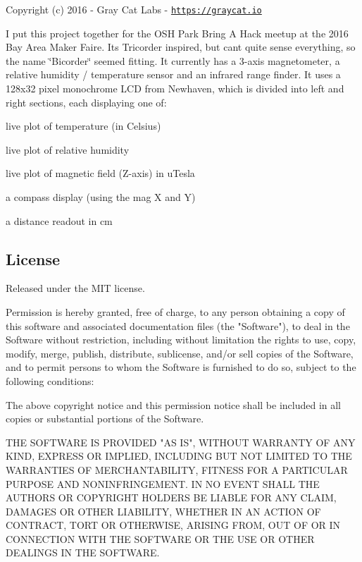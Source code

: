 Copyright (c) 2016 -\/ Gray Cat Labs -\/ \href{https://graycat.io}{\tt https\+://graycat.\+io}

I put this project together for the O\+SH Park Bring A Hack meetup at the 2016 Bay Area Maker Faire. It\textquotesingle{}s Tricorder inspired, but can\textquotesingle{}t quite sense everything, so the name \char`\"{}\+Bicorder\char`\"{} seemed fitting. It currently has a 3-\/axis magnetometer, a relative humidity / temperature sensor and an infrared range finder. It uses a 128x32 pixel monochrome L\+CD from Newhaven, which is divided into left and right sections, each displaying one of\+:


\begin{DoxyItemize}
\item live plot of temperature (in Celsius)
\item live plot of relative humidity
\item live plot of magnetic field (Z-\/axis) in u\+Tesla
\item a compass display (using the mag X and Y)
\item a distance readout in cm
\end{DoxyItemize}

\subsection*{License}

Released under the M\+IT license. \begin{DoxyVerb}Permission is hereby granted, free of charge, to any person obtaining a copy
of this software and associated documentation files (the "Software"), to deal
in the Software without restriction, including without limitation the rights
to use, copy, modify, merge, publish, distribute, sublicense, and/or sell
copies of the Software, and to permit persons to whom the Software is
furnished to do so, subject to the following conditions:

The above copyright notice and this permission notice shall be included in
all copies or substantial portions of the Software.

THE SOFTWARE IS PROVIDED "AS IS", WITHOUT WARRANTY OF ANY KIND, EXPRESS OR
IMPLIED, INCLUDING BUT NOT LIMITED TO THE WARRANTIES OF MERCHANTABILITY,
FITNESS FOR A PARTICULAR PURPOSE AND NONINFRINGEMENT. IN NO EVENT SHALL THE
AUTHORS OR COPYRIGHT HOLDERS BE LIABLE FOR ANY CLAIM, DAMAGES OR OTHER
LIABILITY, WHETHER IN AN ACTION OF CONTRACT, TORT OR OTHERWISE, ARISING FROM,
OUT OF OR IN CONNECTION WITH THE SOFTWARE OR THE USE OR OTHER DEALINGS IN
THE SOFTWARE. \end{DoxyVerb}
 